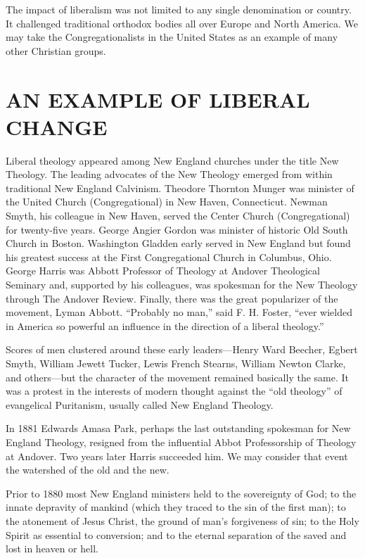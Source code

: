 The impact of liberalism was not limited to any single denomination or country. It challenged
traditional orthodox bodies all over Europe and North America. We may take the Congregationalists in
the United States as an example of many other Christian groups.

\section{AN EXAMPLE OF LIBERAL CHANGE}

Liberal theology appeared among New England churches under the title New Theology. The leading
advocates of the New Theology emerged from within traditional New England Calvinism. Theodore
Thornton Munger was minister of the United Church (Congregational) in New Haven, Connecticut. Newman
Smyth, his colleague in New Haven, served the Center Church (Congregational) for twenty-five years.
George Angier Gordon was minister of historic Old South Church in Boston. Washington Gladden early
served in New England but found his greatest success at the First Congregational Church in Columbus,
Ohio. George Harris was Abbott Professor of Theology at Andover Theological Seminary and, supported
by his colleagues, was spokesman for the New Theology through The Andover Review. Finally, there was
the great popularizer of the movement, Lyman Abbott. “Probably no man,” said F. H. Foster, “ever
wielded in America so powerful an influence in the direction of a liberal theology.”

Scores of men clustered around these early leaders—Henry Ward Beecher, Egbert Smyth, William Jewett
Tucker, Lewis French Stearns, William Newton Clarke, and others—but the character of the movement
remained basically the same. It was a protest in the interests of modern thought against the “old
theology” of evangelical Puritanism, usually called New England Theology.

In 1881 Edwards Amasa Park, perhaps the last outstanding spokesman for New England Theology,
resigned from the influential Abbot Professorship of Theology at Andover. Two years later Harris
succeeded him. We may consider that event the watershed of the old and the new.

Prior to 1880 most New England ministers held to the sovereignty of God; to the innate depravity of
mankind (which they traced to the sin of the first man); to the atonement of Jesus Christ, the
ground of man’s forgiveness of sin; to the Holy Spirit as essential to conversion; and to the
eternal separation of the saved and lost in heaven or hell.

